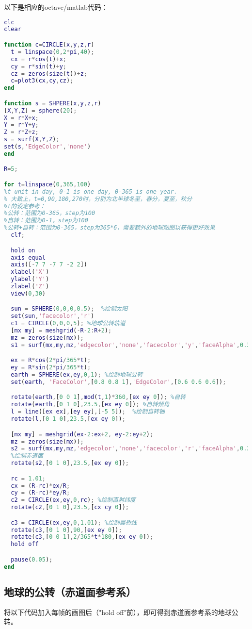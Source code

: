 以下是相应的octave/matlab代码：
\begin{lstlisting}[language=matlab]
clc
clear

function c=CIRCLE(x,y,z,r)
  t = linspace(0,2*pi,40);
  cx = r*cos(t)+x;
  cy = r*sin(t)+y;
  cz = zeros(size(t))+z;
  c=plot3(cx,cy,cz);
end

function s = SHPERE(x,y,z,r)
[X,Y,Z] = sphere(20);
X = r*X+x;
Y = r*Y+y;
Z = r*Z+z;
s = surf(X,Y,Z);
set(s,'EdgeColor','none')
end

R=5;

for t=linspace(0,365,100)
%t unit in day, 0-1 is one day, 0-365 is one year.
% 大致上，t=0,90,180,270时，分别为北半球冬至，春分，夏至，秋分
%t的设定参考：
%公转：范围为0-365，step为100
%自转：范围为0-1，step为100
%公转+自转：范围为0-365，step为365*6，需要额外的地球贴图以获得更好效果
  clf;

  hold on
  axis equal
  axis([-7 7 -7 7 -2 2])
  xlabel('X')
  ylabel('Y')
  zlabel('Z')
  view(0,30)

  sun = SPHERE(0,0,0,0.5);  %绘制太阳
  set(sun,'facecolor','r')
  c1 = CIRCLE(0,0,0,5); %地球公转轨道
  [mx my] = meshgrid(-R-2:R+2);
  mz = zeros(size(mx));
  s1 = surf(mx,my,mz,'edgecolor','none','facecolor','y','faceAlpha',0.3); %黄道面

  ex = R*cos(2*pi/365*t);
  ey = R*sin(2*pi/365*t);
  earth = SPHERE(ex,ey,0,1); %绘制地球公转
  set(earth, 'FaceColor',[0.8 0.8 1],'EdgeColor',[0.6 0.6 0.6]);

  rotate(earth,[0 0 1],mod(t,1)*360,[ex ey 0]); %自转
  rotate(earth,[0 1 0],23.5,[ex ey 0]); %自转倾角
  l = line([ex ex],[ey ey],[-5 5]);  %绘制自转轴
  rotate(l,[0 1 0],23.5,[ex ey 0]);

  [mx my] = meshgrid(ex-2:ex+2, ey-2:ey+2);
  mz = zeros(size(mx));
  s2 = surf(mx,my,mz,'edgecolor','none','facecolor','r','faceAlpha',0.3);
  %绘制赤道面
  rotate(s2,[0 1 0],23.5,[ex ey 0]);

  rc = 1.01;
  cx = (R-rc)*ex/R;
  cy = (R-rc)*ey/R;
  c2 = CIRCLE(ex,ey,0,rc); %绘制直射纬度
  rotate(c2,[0 1 0],23.5,[cx cy 0]);

  c3 = CIRCLE(ex,ey,0,1.01); %绘制晨昏线
  rotate(c3,[0 1 0],90,[ex ey 0]);
  rotate(c3,[0 0 1],2/365*t*180,[ex ey 0]);
  hold off

  pause(0.05);
end
\end{lstlisting}

\subsection{地球的公转（赤道面参考系）}
将以下代码加入每帧的画图后（"hold off"前），即可得到赤道面参考系的地球公转。

